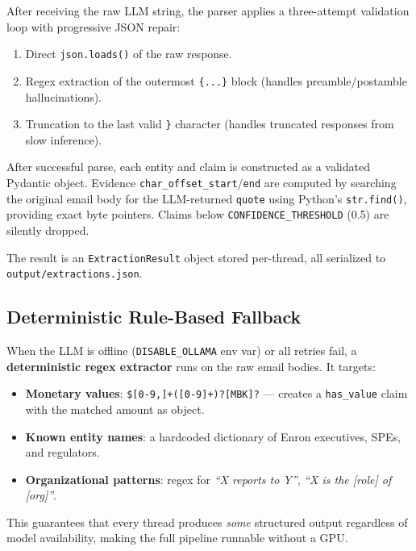 \documentclass[12pt,a4paper]{article}
\begin{document}
After receiving the raw LLM string, the parser applies a three-attempt validation loop with progressive JSON repair:

\begin{enumerate}[label=\textbf{Attempt \arabic*:}]
    \item Direct \texttt{json.loads()} of the raw response.
    \item Regex extraction of the outermost \texttt{\{...\}} block (handles preamble/postamble hallucinations).
    \item Truncation to the last valid \texttt{\}} character (handles truncated responses from slow inference).
\end{enumerate}

After successful parse, each entity and claim is constructed as a validated Pydantic object. Evidence \texttt{char\_offset\_start}/\texttt{end} are computed by searching the original email body for the LLM-returned \texttt{quote} using Python's \texttt{str.find()}, providing exact byte pointers. Claims below \texttt{CONFIDENCE\_THRESHOLD} (0.5) are silently dropped.

The result is an \texttt{ExtractionResult} object stored per-thread, all serialized to \texttt{output/extractions.json}.

\subsection{Deterministic Rule-Based Fallback}

When the LLM is offline (\texttt{DISABLE\_OLLAMA} env var) or all retries fail, a \textbf{deterministic regex extractor} runs on the raw email bodies. It targets:

\begin{itemize}
    \item \textbf{Monetary values}: \texttt{\$[0-9,]+(\.[0-9]+)?[MBK]?} — creates a \texttt{has\_value} claim with the matched amount as object.
    \item \textbf{Known entity names}: a hardcoded dictionary of Enron executives, SPEs, and regulators.
    \item \textbf{Organizational patterns}: regex for \textit{``X reports to Y''}, \textit{``X is the [role] of [org]''}.
\end{itemize}

This guarantees that every thread produces \textit{some} structured output regardless of model availability, making the full pipeline runnable without a GPU.
\end{document}
